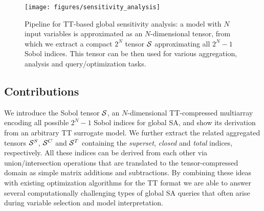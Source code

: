 \documentclass[review, twocolumn]{svjour3}          %
\begin{document}

\begin{figure*}[t]\centering
  \texttt{[image: figures/sensitivity\_analysis]}
  \caption{Pipeline for TT-based global sensitivity analysis: a model with $N$ input variables is approximated as an $N$-dimensional tensor, from which we extract a compact $2^N$ tensor $\mathcal{S}$ approximating all $2^N-1$ Sobol indices. This tensor can be then used for various aggregation, analysis and query/optimization tasks.}
  \label{fig:sensitivity_analysis}
\end{figure*}

\subsection{Contributions}

We introduce the Sobol tensor $\mathcal{S}$, an $N$-dimensional TT-compressed multiarray encoding all possible $2^N-1$ Sobol indices for global SA, and show its derivation from an arbitrary TT surrogate model. We further extract the related aggregated tensors $\mathcal{S}^S$, $\mathcal{S}^C$ and $\mathcal{S}^T$ containing the \emph{superset}, \emph{closed} and \emph{total} indices, respectively. All these indices can be derived from each other via union/intersection operations that are translated to the tensor-compressed domain as simple matrix additions and subtractions.
By combining these ideas with existing optimization algorithms for the TT format we are able to answer several computationally challenging types of global SA queries that often arise during variable selection and model interpretation.
\end{document}
